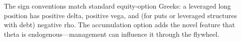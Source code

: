 \begin{remark}
The sign conventions match standard equity-option Greeks: a leveraged
long position has positive delta, positive vega, and (for puts or
leveraged structures with debt) negative rho.  The accumulation option
adds the novel feature that theta is endogenous---management can
influence it through the flywheel.
\end{remark}
